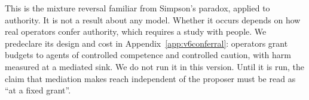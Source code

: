 This is the mixture reversal familiar from Simpson's paradox, applied to authority. It is not a result about any model.
Whether it occurs depends on how real operators confer authority, which requires a study with people. We predeclare its
design and cost in Appendix~\ref{app:v6conferral}: operators grant budgets to agents of controlled competence and
controlled caution, with harm measured at a mediated sink. We do not run it in this version. Until it is run, the claim
that mediation makes reach independent of the proposer must be read as ``at a fixed grant''.
